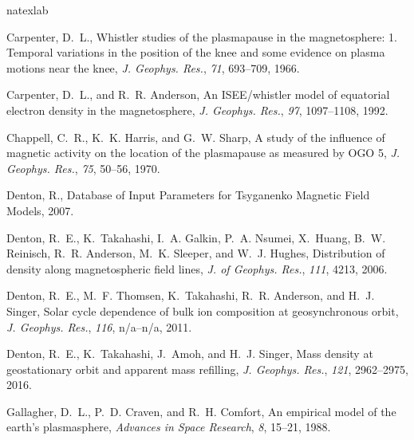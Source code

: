 \documentclass[draft,linenumbers]{agujournal}
\begin{document}

\begin{thebibliography}{16}
	\expandafter\ifx\csname natexlab\endcsname\relax\def\natexlab#1{#1}\fi
	
	Carpenter, D.~L., Whistler studies of the plasmapause in the magnetosphere: 1.
	{T}emporal variations in the position of the knee and some evidence on plasma
	motions near the knee, {\it J. Geophys. Res.\/}, {\it 71\/}, 693--709, 1966.
	
	Carpenter, D.~L., and R.~R. Anderson, An {ISEE}/whistler model of equatorial
	electron density in the magnetosphere, {\it J. Geophys. Res.\/}, {\it 97\/},
	1097--1108, 1992.
	
	Chappell, C.~R., K.~K. Harris, and G.~W. Sharp, A study of the influence of
	magnetic activity on the location of the plasmapause as measured by {OGO} 5,
	{\it J. Geophys. Res.\/}, {\it 75\/}, 50--56, 1970.
	
	{Denton}, R., {Database of Input Parameters for Tsyganenko Magnetic Field
		Models}, 2007.
	
	{Denton}, R.~E., K.~{Takahashi}, I.~A. {Galkin}, P.~A. {Nsumei}, X.~{Huang},
	B.~W. {Reinisch}, R.~R. {Anderson}, M.~K. {Sleeper}, and W.~J. {Hughes},
	{Distribution of density along magnetospheric field lines}, {\it J. of
		Geophys. Res.\/}, {\it 111\/}, 4213, 2006.
	
	Denton, R.~E., M.~F. Thomsen, K.~Takahashi, R.~R. Anderson, and H.~J. Singer,
	Solar cycle dependence of bulk ion composition at geosynchronous orbit, {\it
		J. Geophys. Res.\/}, {\it 116\/}, n/a--n/a, 2011.
	
	Denton, R.~E., K.~Takahashi, J.~Amoh, and H.~J. Singer, Mass density at
	geostationary orbit and apparent mass refilling, {\it J. Geophys. Res.\/},
	{\it 121\/}, 2962--2975, 2016.
	
	{Gallagher}, D.~L., P.~D. {Craven}, and R.~H. {Comfort}, {An empirical model of
		the earth's plasmasphere}, {\it Advances in Space Research\/}, {\it 8\/},
	15--21, 1988.
	

\end{thebibliography}
\end{document}
